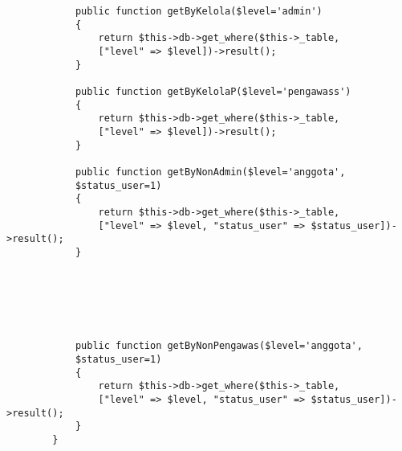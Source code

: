 \begin{verbatim}
			public function getByKelola($level='admin')
			{
				return $this->db->get_where($this->_table, 
				["level" => $level])->result();
			}
			
			public function getByKelolaP($level='pengawass')
			{
				return $this->db->get_where($this->_table, 
				["level" => $level])->result();
			}
			
			public function getByNonAdmin($level='anggota', 
			$status_user=1)
			{
				return $this->db->get_where($this->_table, 
				["level" => $level, "status_user" => $status_user])->result();
			}
			
			
			
			
			
			
			public function getByNonPengawas($level='anggota', 
			$status_user=1)
			{
				return $this->db->get_where($this->_table, 
				["level" => $level, "status_user" => $status_user])->result();
			}
		}	
\end{verbatim}

